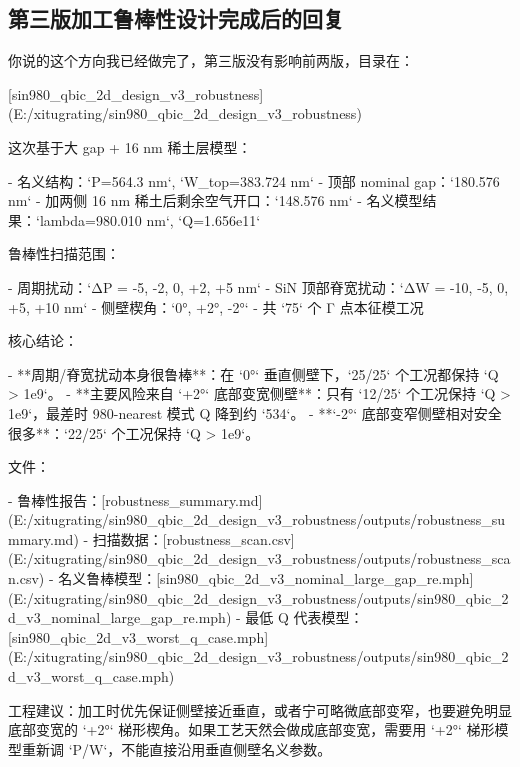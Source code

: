 \documentclass[11pt,a4paper]{ctexart}
\begin{document}
\subsection{第三版加工鲁棒性设计完成后的回复}
\begin{ExactText}
你说的这个方向我已经做完了，第三版没有影响前两版，目录在：

[sin980_qbic_2d_design_v3_robustness](E:/xitugrating/sin980_qbic_2d_design_v3_robustness)

这次基于大 gap + 16 nm 稀土层模型：

- 名义结构：`P=564.3 nm`, `W_top=383.724 nm`
- 顶部 nominal gap：`180.576 nm`
- 加两侧 16 nm 稀土后剩余空气开口：`148.576 nm`
- 名义模型结果：`lambda=980.010 nm`, `Q=1.656e11`

鲁棒性扫描范围：

- 周期扰动：`ΔP = -5, -2, 0, +2, +5 nm`
- SiN 顶部脊宽扰动：`ΔW = -10, -5, 0, +5, +10 nm`
- 侧壁楔角：`0°, +2°, -2°`
- 共 `75` 个 Γ 点本征模工况

核心结论：

- **周期/脊宽扰动本身很鲁棒**：在 `0°` 垂直侧壁下，`25/25` 个工况都保持 `Q > 1e9`。
- **主要风险来自 `+2°` 底部变宽侧壁**：只有 `12/25` 个工况保持 `Q > 1e9`，最差时 980-nearest 模式 Q 降到约 `534`。
- **`-2°` 底部变窄侧壁相对安全很多**：`22/25` 个工况保持 `Q > 1e9`。

文件：

- 鲁棒性报告：[robustness_summary.md](E:/xitugrating/sin980_qbic_2d_design_v3_robustness/outputs/robustness_summary.md)
- 扫描数据：[robustness_scan.csv](E:/xitugrating/sin980_qbic_2d_design_v3_robustness/outputs/robustness_scan.csv)
- 名义鲁棒模型：[sin980_qbic_2d_v3_nominal_large_gap_re.mph](E:/xitugrating/sin980_qbic_2d_design_v3_robustness/outputs/sin980_qbic_2d_v3_nominal_large_gap_re.mph)
- 最低 Q 代表模型：[sin980_qbic_2d_v3_worst_q_case.mph](E:/xitugrating/sin980_qbic_2d_design_v3_robustness/outputs/sin980_qbic_2d_v3_worst_q_case.mph)

工程建议：加工时优先保证侧壁接近垂直，或者宁可略微底部变窄，也要避免明显底部变宽的 `+2°` 梯形楔角。如果工艺天然会做成底部变宽，需要用 `+2°` 梯形模型重新调 `P/W`，不能直接沿用垂直侧壁名义参数。
\end{ExactText}
\end{document}
